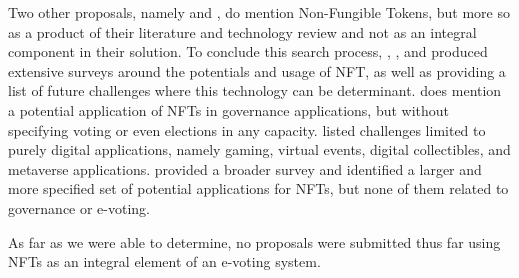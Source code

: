 \documentclass[../main.tex]{subfiles}
\begin{document}
\par
Two other proposals, namely \cite{Bistarelli2022} and \cite{Agbesi2019}, do mention Non-Fungible Tokens, but more so as a product of their literature and technology review and not as an integral component in their solution. To conclude this search process, \cite{Ali2023}, \cite{Bao2022}, and \cite{Wang2021} produced extensive surveys around the potentials and usage of NFT, as well as providing a list of future challenges where this technology can be determinant. \cite{Ali2023} does mention a potential application of NFTs in governance applications, but without specifying voting or even elections in any capacity. \cite{Wang2021} listed challenges limited to purely digital applications, namely gaming, virtual events, digital collectibles, and metaverse applications. \cite{Bao2022} provided a broader survey and identified a larger and more specified set of potential applications for NFTs, but none of them related to governance or e-voting.
\par
As far as we were able to determine, no proposals were submitted thus far using NFTs as an integral element of an e-voting system.
\end{document}
